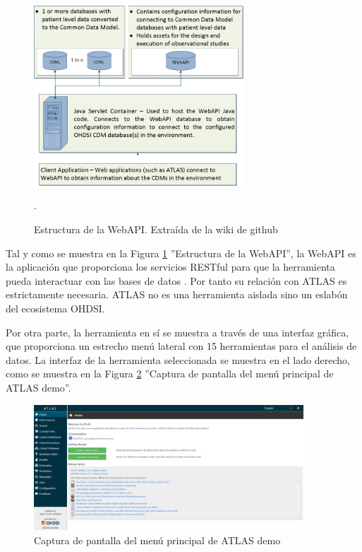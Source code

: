 \begin{figure}[H]
    \centering
    \includegraphics[width=0.700\textwidth]{figures/webAPIwiki.png}
     \caption{Estructura de la WebAPI. Extraída de la wiki de github \cite{githubWebAPIwiki}}.
    \label{fig:webAPIwiki}
\end{figure}

Tal y como se muestra en la Figura \ref{fig:webAPIwiki} ''Estructura de la WebAPI'', la WebAPI es la aplicación que proporciona los servicios RESTful para que la herramienta pueda interactuar con las bases de datos \cite{githubWebAPIwiki}. Por tanto su relación con ATLAS es estrictamente necesaria. ATLAS no es una herramienta aislada sino un eslabón del ecosistema OHDSI.

Por otra parte, la herramienta en sí se muestra a través de una interfaz gráfica, que proporciona un estrecho menú lateral con 15 herramientas para el análisis de datos. La interfaz de la herramienta seleccionada se muestra en el lado derecho, como se muestra en la Figura \ref{fig:ATLASdemoHome} ''Captura de pantalla del menú principal de ATLAS demo''.

\begin{figure}[H]
\centering
\includegraphics[width=0.90\textwidth]{figures/ATLASdemoHome.png}
     \caption{Captura de pantalla del menú principal de ATLAS demo}
    \label{fig:ATLASdemoHome}
\end{figure}

